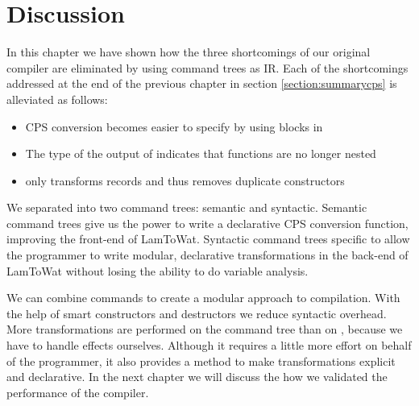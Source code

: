 \section{\label{section:summarytree}Discussion}
In this chapter we have shown how the three shortcomings of our original compiler are eliminated by using command trees as IR. Each of the shortcomings addressed at the end of the previous chapter in section \ref{section:summarycps} is alleviated as follows: 

\begin{itemize}
\item CPS conversion becomes easier to specify by using blocks in 
\item The type of the output of  indicates that functions are no longer nested
\item {} only transforms records and thus removes duplicate constructors
\end{itemize}

We separated  into two command trees: semantic and syntactic. Semantic command trees give us the power to write a declarative CPS conversion function, improving the front-end of LamToWat. Syntactic command trees specific to  allow the programmer to write modular, declarative transformations in the back-end of LamToWat without losing the ability to do variable analysis.

We can combine commands to create a modular approach to compilation. With the help of smart constructors and destructors we reduce syntactic overhead. More transformations are performed on the command tree than on , because we have to handle effects ourselves. Although it requires a little more effort on behalf of the programmer, it also provides a method to make transformations explicit and declarative. In the next chapter we will discuss the how we validated the performance of the compiler.
